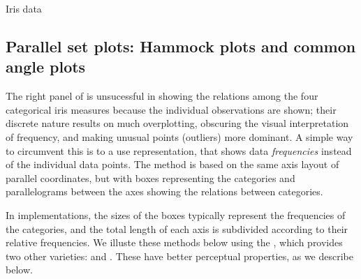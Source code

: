 \documentclass[11pt]{book}
\renewenvironment{knitrout}{\small\renewcommand{\baselinestretch}{.85}}{} %
\begin{document}
\begin{Example}[iris1]{Iris data}
\begin{knitrout}
\begin{kframe}
\begin{alltt}
   \hlstd{= vnames[}\hlstd{(}\hlstd{,}\hlstd{,}\hlstd{,}\hlstd{)],} 
   \hlstd{=} \hlstd{,} \hlstd{=}\hlstd{,}
  \hlstd{=}\hlstd{(}\hlstd{(}\hlstd{,}\hlstd{,}\hlstd{,}\hlstd{),} \hlstd{(}\hlstd{,}\hlstd{,}\hlstd{,}\hlstd{),} \hlstd{(}\hlstd{,}\hlopt{/}\hlstd{,}\hlstd{,}\hlstd{) )}
  \hlstd{)}
\end{alltt}
\end{kframe}
\end{knitrout}

\end{Example}

\subsection{Parallel set plots: Hammock plots and common angle plots}

The right panel of  is unsucessful in showing the
relations among the four categorical iris measures because the individual
observations are shown; their discrete nature results on much overplotting,
obscuring the visual interpretation of frequency, and making unusual
points (outliers) more dominant.  A simple way to circumvent this is to a
use  \citep{Kosara-etal:2006} representation, that
shows data \emph{frequencies} instead of the individual data points. The
method is based on the same axis layout of parallel coordinates,
but with boxes representing the categories and parallelograms
between the axes showing the relations between categories.

In implementations, the sizes of the boxes typically represent the frequencies of
the categories, and the total length of each axis is subdivided according to
their relative frequencies. We illuste these methods below using the , which provides two other varieties: 
 \citep{Schonlau:2003} and
 \citep{HofmannVendettuoli:2013}.
These have better perceptual properties, as we describe below.
\end{document}
